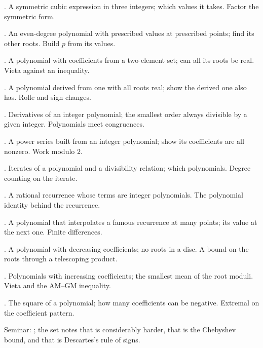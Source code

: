 \begin{ladder}
\item {}. A symmetric cubic expression in three integers; which values it takes. Factor the symmetric form.
\item {}. An even-degree polynomial with prescribed values at prescribed points; find its other roots. Build $p$ from its values.
\item {}. A polynomial with coefficients from a two-element set; can all its roots be real. Vieta against an inequality.
\item {}. A polynomial derived from one with all roots real; show the derived one also has. Rolle and sign changes.
\item {}. Derivatives of an integer polynomial; the smallest order always divisible by a given integer. Polynomials meet congruences.
\item {}. A power series built from an integer polynomial; show its coefficients are all nonzero. Work modulo $2$.
\item {}. Iterates of a polynomial and a divisibility relation; which polynomials. Degree counting on the iterate.
\item {}. A rational recurrence whose terms are integer polynomials. The polynomial identity behind the recurrence.
\item {}. A polynomial that interpolates a famous recurrence at many points; its value at the next one. Finite differences.
\item {}. A polynomial with decreasing coefficients; no roots in a disc. A bound on the roots through a telescoping product.
\item {}. Polynomials with increasing coefficients; the smallest mean of the root moduli. Vieta and the AM--GM inequality.
\item {}. The square of a polynomial; how many coefficients can be negative. Extremal on the coefficient pattern.
\end{ladder}

Seminar: ; the set notes that  is considerably harder, that  is the Chebyshev bound, and that  is Descartes's rule of signs.

